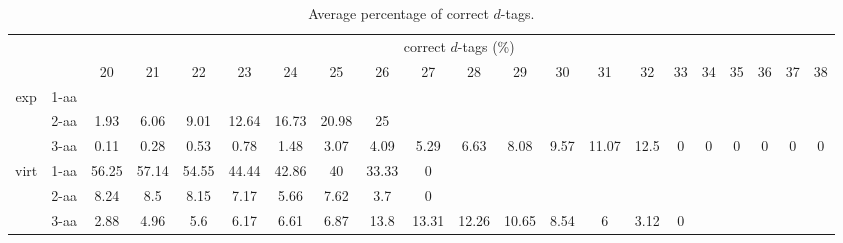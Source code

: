 \begin{table}[h]\tiny
\vspace{3mm}
{\centering
\begin{center}
\begin{tabular}{|c|l|c|c|c|c|c|c|c|c|c|c|c|c|c|c|c|c|c|c|c|}
  \hline
  \multicolumn{2}{|c|}{ } & \multicolumn{ 19 }{|c|}{ correct $d$-tags (\%)} \\
  \cline{3- 21}
  \multicolumn{2}{|c|}{ }  & 20 & 21 & 22 & 23 & 24 & 25 & 26 & 27 & 28 & 29 & 30 & 31 & 32 & 33 & 34 & 35 & 36 & 37 & 38\\
  \hline
  \multirow{3}{*}{exp}
&  1-aa  &  &  &  &  &  &  &  &  &  &  &  &  &  &  &  &  &  &  & \\
&  2-aa  & 1.93 & 6.06 & 9.01 & 12.64 & 16.73 & 20.98 & 25 &  &  &  &  &  &  &  &  &  &  &  & \\
&  3-aa  & 0.11 & 0.28 & 0.53 & 0.78 & 1.48 & 3.07 & 4.09 & 5.29 & 6.63 & 8.08 & 9.57 & 11.07 & 12.5 & 0 & 0 & 0 & 0 & 0 & 0\\
 \hline
  \multirow{3}{*}{virt} 
&  1-aa  & 56.25 & 57.14 & 54.55 & 44.44 & 42.86 & 40 & 33.33 & 0 &  &  &  &  &  &  &  &  &  &  & \\
&  2-aa  & 8.24 & 8.5 & 8.15 & 7.17 & 5.66 & 7.62 & 3.7 & 0 &  &  &  &  &  &  &  &  &  &  & \\
&  3-aa  & 2.88 & 4.96 & 5.6 & 6.17 & 6.61 & 6.87 & 13.8 & 13.31 & 12.26 & 10.65 & 8.54 & 6 & 3.12 & 0 &  &  &  &  & \\
 \hline
\end{tabular}
\end{center}
\par}
\centering

\caption{ Average percentage of correct $d$-tags.}

\vspace{3mm}
\label{table:correct-d-tags}
\end{table}
